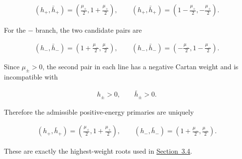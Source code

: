 \begin{align}
\left( h_{+}, \bar{h}_{+} \right)
=
\left( \frac{\mu_{+}}{2}, 1 + \frac{\mu_{+}}{2} \right),
\qquad
\left( h_{+}, \bar{h}_{+} \right)
=
\left( 1 - \frac{\mu_{+}}{2}, - \frac{\mu_{+}}{2} \right).
\end{align}

For the $-$ branch, the two candidate pairs are

\begin{align}
\left( h_{-}, \bar{h}_{-} \right)
=
\left( 1 + \frac{\mu_{-}}{2}, \frac{\mu_{-}}{2} \right),
\qquad
\left( h_{-}, \bar{h}_{-} \right)
=
\left( - \frac{\mu_{-}}{2}, 1 - \frac{\mu_{-}}{2} \right).
\end{align}

Since $\mu_{\pm} > 0$, the second pair in each line has a negative Cartan weight and is incompatible with

\begin{align}
h_{\pm} > 0,
\qquad
\bar{h}_{\pm} > 0.
\end{align}

Therefore the admissible positive-energy primaries are uniquely

\begin{align}
\left( h_{+}, \bar{h}_{+} \right)
=
\left( \frac{\mu_{+}}{2}, 1 + \frac{\mu_{+}}{2} \right),
\qquad
\left( h_{-}, \bar{h}_{-} \right)
=
\left( 1 + \frac{\mu_{-}}{2}, \frac{\mu_{-}}{2} \right).
\end{align}

These are exactly the highest-weight roots used in \hyperref[subsec:solving-modes]{Section~3.4}.
